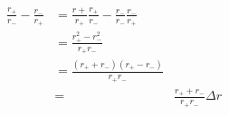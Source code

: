 \begin{eqnarray}\label{eqn:net-likelihood}
\frac{r_+}{r_-} - \frac{r_-}{r_+} & =  \frac{r+}{r_+}\frac{r_+}{r_-} - \frac{r_-}{r_-}\frac{r_-}{r_+} \\
& =  \frac{r_+^2 - r_-^2}{r_+r_-} \\
& =  \frac{(r_+ + r_-)(r_+ - r_-)}{r_+r_-} \\
& = & \frac{r_+ + r_-}{r_+r_-}\Delta r \\
\end{eqnarray}